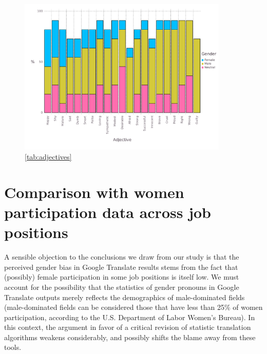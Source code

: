 \documentclass[fleqn,10pt]{article}
\begin{document}
\begin{figure}[H]
	\centering
	\includegraphics[width=10cm]{pictures/barplot-adjectives}
	\caption{ \ref{tab:adjectives} }
	\label{fig:barplot-adjectives}
\end{figure}

\section{Comparison with women participation data across job positions}\label{sec:comparison-women-participation}

A sensible objection to the conclusions we draw from our study is that the perceived gender bias in Google Translate results stems from the fact that (possibly) female participation in some job positions is itself low. We must account for the possibility that the statistics of gender pronouns in Google Translate outputs merely reflects the demographics of male-dominated fields (male-dominated fields can be considered those that have less than 25\% of women participation\citep{WB2014}, according to the U.S. Department of Labor Women's Bureau). In this context, the argument in favor of a critical revision of statistic translation algorithms weakens considerably, and possibly shifts the blame away from these tools.
\end{document}
